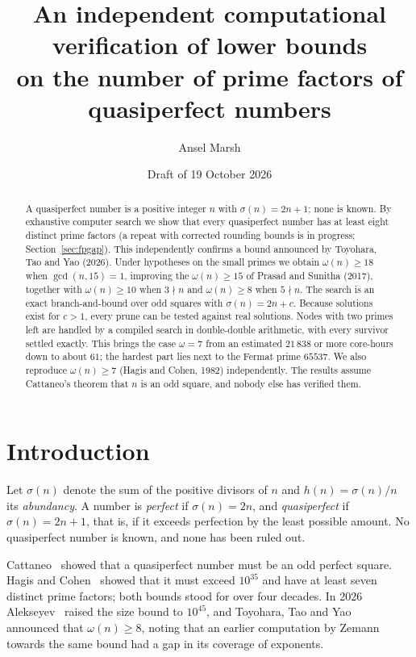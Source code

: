 \documentclass[11pt]{amsart}
\title[Prime factors of quasiperfect numbers]{An independent computational verification of lower bounds\\
  on the number of prime factors of quasiperfect numbers}
\author{Ansel Marsh}
\date{Draft of 19 October 2026}
\theoremstyle{remark}
\begin{document}
\begin{abstract}
A quasiperfect number is a positive integer $n$ with $\sigma(n) = 2n+1$; none is
known. By exhaustive computer search we show that every quasiperfect number has
at least eight distinct prime factors (a repeat with corrected rounding bounds is
in progress; Section~\ref{sec:fpgap}). This independently confirms a bound
announced by Toyohara, Tao and Yao (2026). Under hypotheses on the small primes
we obtain $\omega(n) \ge 18$ when $\gcd(n,15) = 1$, improving the
$\omega(n) \ge 15$ of Prasad and Sunitha (2017), together with $\omega(n) \ge 10$
when $3 \nmid n$ and $\omega(n) \ge 8$ when $5 \nmid n$. The search is an exact
branch-and-bound over odd squares with $\sigma(n) = 2n + c$. Because solutions
exist for $c > 1$, every prune can be tested against real solutions. Nodes with
two primes left are handled by a compiled search in double-double arithmetic,
with every survivor settled exactly. This brings the case $\omega = 7$ from an
estimated $21\,838$ or more core-hours down to about $61$; the hardest part lies
next to the Fermat prime $65537$. We also reproduce $\omega(n) \ge 7$ (Hagis and
Cohen, 1982) independently. The results assume Cattaneo's theorem that $n$ is an
odd square, and nobody else has verified them.
\end{abstract}

\maketitle

\section{Introduction}

Let $\sigma(n)$ denote the sum of the positive divisors of $n$ and
$h(n) = \sigma(n)/n$ its \emph{abundancy}. A number is \emph{perfect} if
$\sigma(n) = 2n$, and \emph{quasiperfect} if $\sigma(n) = 2n+1$, that is, if it
exceeds perfection by the least possible amount. No quasiperfect number is
known, and none has been ruled out.

Cattaneo~\cite{cattaneo} showed that a quasiperfect number must be an odd
perfect square. Hagis and Cohen~\cite{hagiscohen} showed that it must exceed
$10^{35}$ and have at least seven distinct prime factors; both bounds stood
for over four decades. In 2026 Alekseyev~\cite{alekseyev} raised the size
bound to $10^{45}$, and Toyohara, Tao and Yao~\cite{tty} announced that
$\omega(n) \ge 8$, noting that an earlier computation by Zemann~\cite{zemann}
towards the same bound had a gap in its coverage of exponents.
\end{document}
